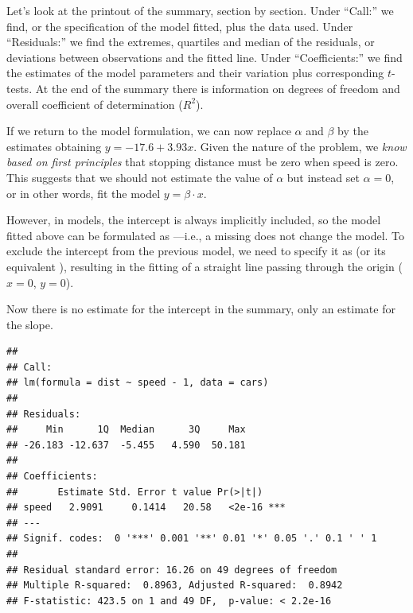 \documentclass[krantz2]{krantz}\usepackage{knitr}
\begin{document}
Let's look at the printout of the summary, section by section. Under ``Call:'' we find,  or the specification of the model fitted, plus the data used. Under ``Residuals:'' we find the extremes, quartiles and median of the residuals, or deviations between observations and the fitted line. Under ``Coefficients:'' we find the estimates of the model parameters and their variation plus corresponding $t$-tests. At the end of the summary there is information on degrees of freedom and overall coefficient of determination ($R^2$).

If we return to the model formulation, we can now replace $\alpha$ and $\beta$ by the estimates obtaining $y = -17.6 + 3.93 x$. Given the nature of the problem, we \emph{know based on first principles} that stopping distance must be zero when speed is zero. This suggests that we should not estimate the value of $\alpha$ but instead set $\alpha = 0$, or in other words, fit the model $y = \beta \cdot x$.

However, in \Rlang models, the intercept is always implicitly included, so the model fitted above can be formulated as ---i.e., a missing  does not change the model. To exclude the intercept from the previous model, we need to specify it as  (or its equivalent ), resulting in the fitting of a straight line passing through the origin ($x = 0$, $y = 0$).

Now there is no estimate for the intercept in the summary, only an estimate for the slope.

\begin{knitrout}\footnotesize
{}\color{fgcolor}\begin{kframe}
\begin{alltt}
 \hlkwb{<-}  \hlopt{~}  \hlopt{-} \hlstd{,}  
\end{alltt}
\begin{verbatim}
## 
## Call:
## lm(formula = dist ~ speed - 1, data = cars)
## 
## Residuals:
##     Min      1Q  Median      3Q     Max 
## -26.183 -12.637  -5.455   4.590  50.181 
## 
## Coefficients:
##       Estimate Std. Error t value Pr(>|t|)    
## speed   2.9091     0.1414   20.58   <2e-16 ***
## ---
## Signif. codes:  0 '***' 0.001 '**' 0.01 '*' 0.05 '.' 0.1 ' ' 1
## 
## Residual standard error: 16.26 on 49 degrees of freedom
## Multiple R-squared:  0.8963,	Adjusted R-squared:  0.8942 
## F-statistic: 423.5 on 1 and 49 DF,  p-value: < 2.2e-16
\end{verbatim}
\end{kframe}
\end{knitrout}
\end{document}
